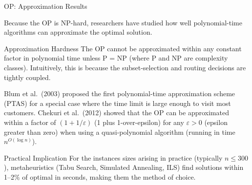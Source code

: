 \documentclass[aspectratio=169,10pt]{beamer}
\begin{document}
\begin{frame}[allowframebreaks]{OP: Approximation Results}

  Because the OP is NP-hard, researchers have studied how well
  polynomial-time algorithms can approximate the optimal solution.

  \medskip
  \begin{block}{Approximation Hardness}
    The OP cannot be approximated within any constant factor in polynomial
    time unless P = NP (where P and NP are complexity classes).
    Intuitively, this is because the subset-selection and routing decisions
    are tightly coupled.
  \end{block}

  \medskip
  Blum et al.\ (2003) proposed the first polynomial-time approximation
  scheme (PTAS) for a special case where the time limit is large enough
  to visit most customers.
  Chekuri et al.\ (2012) showed that the OP can be approximated within a
  factor of $(1 + 1/\varepsilon)$ (1 plus 1-over-epsilon) for any
  $\varepsilon > 0$ (epsilon greater than zero) when using a quasi-polynomial
  algorithm (running in time $n^{O(\log n)}$).

  \medskip
  \begin{alertblock}{Practical Implication}
    For the instances sizes arising in practice (typically $n \le 300$),
    metaheuristics (Tabu Search, Simulated Annealing, ILS) find solutions
    within 1--2\% of optimal in seconds, making them the method of choice.
  \end{alertblock}

\end{frame}
\end{document}
